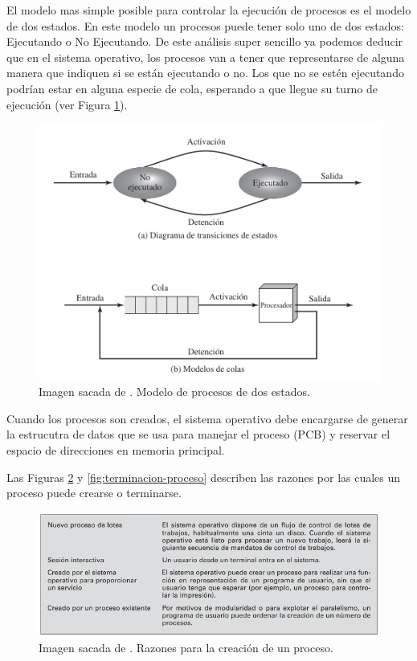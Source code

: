 \documentclass[12pt]{article}
\begin{document}
  El modelo mas simple posible para controlar la ejecución de procesos es el modelo de dos estados. En este modelo un procesos puede tener solo uno de dos estados: Ejecutando o No Ejecutando. De este análisis super sencillo ya podemos deducir que en el sistema operativo, los procesos van a tener que representarse de alguna manera que indiquen si se están ejecutando o no. Los que no se estén ejecutando podrían estar en alguna especie de cola, esperando a que llegue su turno de ejecución (ver Figura \ref{fig:procesos-dos-estados}).

  \begin{figure}[H]
    \centering
    \includegraphics[width=0.7\linewidth]{imagenes/procesos-dos-estados.png}
    \caption{Imagen sacada de \parencite{sostallings}. Modelo de procesos de dos estados.}
    \label{fig:procesos-dos-estados}
  \end{figure}

  Cuando los procesos son creados, el sistema operativo debe encargarse de generar la estrucutra de datos que se usa para manejar el proceso (PCB) y reservar el espacio de direcciones en memoria principal.

  Las Figuras \ref{fig:creacion-proceso} y \ref{fig:terminacion-proceso} describen las razones por las cuales un proceso puede crearse o terminarse.

  \begin{figure}[H]
    \centering
    \includegraphics[width=0.9\linewidth]{imagenes/creacion-proceso.png}
    \caption{Imagen sacada de \parencite{sostallings}. Razones para la creación de un proceso.}
    \label{fig:creacion-proceso}
  \end{figure}
  
\end{document}
